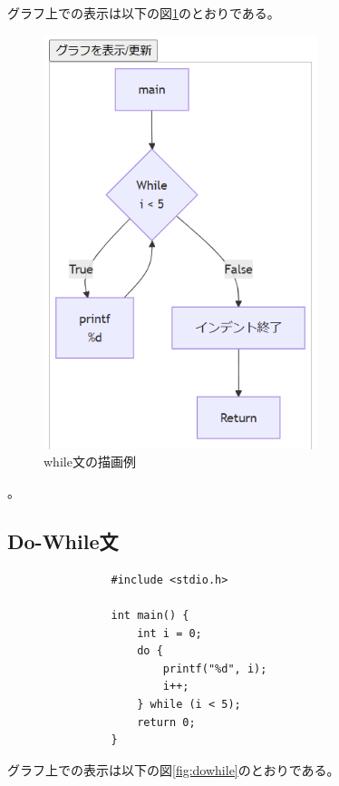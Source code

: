 \documentclass{cssspaper}
\begin{document}
            グラフ上での表示は以下の図\ref{fig:while}のとおりである。
            
            \begin{figure}[h]
                \centering
                \includegraphics[width=8cm]{while.png}
                \caption{while文の描画例}
                \label{fig:while}
            \end{figure}。

            \subsection{Do-While文}
            \begin{lstlisting}
                #include <stdio.h>

                int main() {
                    int i = 0;
                    do {
                        printf("%d", i);
                        i++;
                    } while (i < 5);
                    return 0;
                }
            \end{lstlisting}

            グラフ上での表示は以下の図\ref{fig:dowhile}のとおりである。
\end{document}
